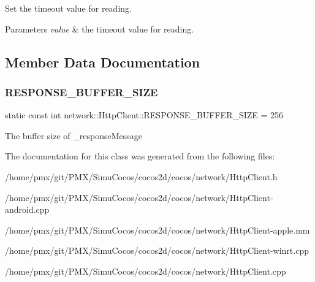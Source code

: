 Set the timeout value for reading.


\begin{DoxyParams}{Parameters}
{\em value} & the timeout value for reading. \\
\hline
\end{DoxyParams}


\subsection{Member Data Documentation}
\mbox{\label{classnetwork_1_1HttpClient_aabc39c6245854ba7593237e8da6ca2ee}} 
\subsubsection{\texorpdfstring{R\+E\+S\+P\+O\+N\+S\+E\+\_\+\+B\+U\+F\+F\+E\+R\+\_\+\+S\+I\+ZE}{RESPONSE\_BUFFER\_SIZE}}
{\footnotesize\ttfamily static const int network\+::\+Http\+Client\+::\+R\+E\+S\+P\+O\+N\+S\+E\+\_\+\+B\+U\+F\+F\+E\+R\+\_\+\+S\+I\+ZE = 256\hspace{0.3cm}{\ttfamily [static]}}

The buffer size of \+\_\+response\+Message 

The documentation for this class was generated from the following files\+:\begin{DoxyCompactItemize}
\item 
/home/pmx/git/\+P\+M\+X/\+Simu\+Cocos/cocos2d/cocos/network/Http\+Client.\+h\item 
/home/pmx/git/\+P\+M\+X/\+Simu\+Cocos/cocos2d/cocos/network/Http\+Client-\/android.\+cpp\item 
/home/pmx/git/\+P\+M\+X/\+Simu\+Cocos/cocos2d/cocos/network/Http\+Client-\/apple.\+mm\item 
/home/pmx/git/\+P\+M\+X/\+Simu\+Cocos/cocos2d/cocos/network/Http\+Client-\/winrt.\+cpp\item 
/home/pmx/git/\+P\+M\+X/\+Simu\+Cocos/cocos2d/cocos/network/Http\+Client.\+cpp\end{DoxyCompactItemize}
